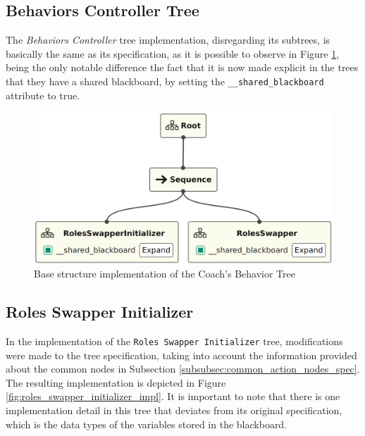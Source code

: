 \subsection{Behaviors Controller Tree}

The \textit{Behaviors Controller} tree implementation, disregarding its subtrees, is basically the same as its specification, as it is possible to observe in Figure \ref{fig:behaviors_controller_bt_impl}, being the only notable difference the fact that it is now made explicit in the trees that they have a shared blackboard, by setting the \texttt{\_\_shared\_blackboard} attribute to true.

\begin{figure}[!h]
    \centering
    \includegraphics[width=0.7\linewidth]{chapters/development/images/BehaviorsController.png}
    \caption{Base structure implementation of the Coach’s Behavior Tree}
    \label{fig:behaviors_controller_bt_impl}
\end{figure}

\subsection{Roles Swapper Initializer}

In the implementation of the \texttt{Roles Swapper Initializer} tree, modifications were made to the tree specification, taking into account the information provided about the common nodes in Subsection \ref{subsubsec:common_action_nodes_spec}. The resulting implementation is depicted in Figure \ref{fig:roles_swapper_initializer_impl}. It is important to note that there is one implementation detail in this tree that deviates from its original specification, which is the data types of the variables stored in the blackboard.

